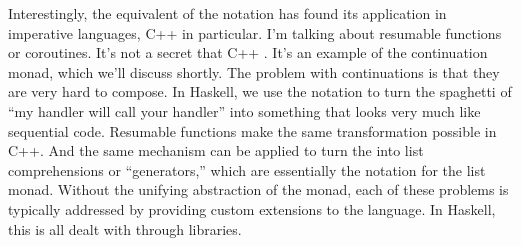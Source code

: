Interestingly, the equivalent of the  notation has found its
application in imperative languages, C++ in particular. I'm talking
about resumable functions or coroutines. It's not a secret that C++
. It's an example of the continuation monad, which we'll
discuss shortly. The problem with continuations is that they are very
hard to compose. In Haskell, we use the  notation to turn the
spaghetti of ``my handler will call your handler'' into something that
looks very much like sequential code. Resumable functions make the same
transformation possible in C++. And the same mechanism can be applied to
turn the
 into list comprehensions or ``generators,'' which are
essentially the  notation for the list monad. Without the
unifying abstraction of the monad, each of these problems is typically
addressed by providing custom extensions to the language. In Haskell,
this is all dealt with through libraries.
